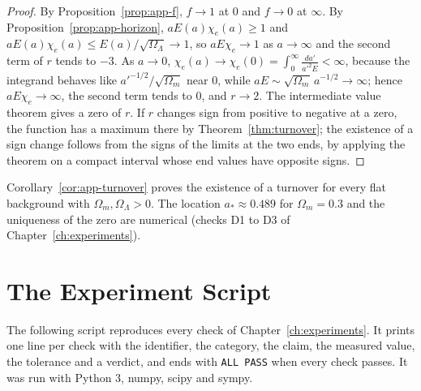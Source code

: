 \documentclass[11pt,oneside]{book}
\theoremstyle{definition}
\theoremstyle{remark}
\begin{document}
\begin{proof}
By Proposition~\ref{prop:app-f}, $f\to1$ at $0$ and $f\to0$ at $\infty$. By Proposition~\ref{prop:app-horizon}, $aE(a)\chi_e(a)\geq1$ and $aE(a)\chi_e(a)\leq E(a)/\sqrt{\Omega_\Lambda}\to1$, so $aE\chi_e\to1$ as $a\to\infty$ and the second term of $r$ tends to $-3$. As $a\to0$, $\chi_e(a)\to\chi_e(0)=\int_0^\infty\frac{da'}{a'^2E}<\infty$, because the integrand behaves like $a'^{-1/2}/\sqrt{\Omega_m}$ near $0$, while $aE\sim\sqrt{\Omega_m}\,a^{-1/2}\to\infty$; hence $aE\chi_e\to\infty$, the second term tends to $0$, and $r\to2$. The intermediate value theorem gives a zero of $r$. If $r$ changes sign from positive to negative at a zero, the function has a maximum there by Theorem~\ref{thm:turnover}; the existence of a sign change follows from the signs of the limits at the two ends, by applying the theorem on a compact interval whose end values have opposite signs.
\end{proof}

Corollary~\ref{cor:app-turnover} proves the existence of a turnover for every flat background with $\Omega_m,\Omega_\Lambda>0$. The location $a_*\approx0.489$ for $\Omega_m=0.3$ and the uniqueness of the zero are numerical (checks D1 to D3 of Chapter~\ref{ch:experiments}).

\chapter{The Experiment Script}\label{app:script}

The following script reproduces every check of Chapter~\ref{ch:experiments}. It prints one line per check with the identifier, the category, the claim, the measured value, the tolerance and a verdict, and ends with \texttt{ALL PASS} when every check passes. It was run with Python 3, numpy, scipy and sympy.
\end{document}
